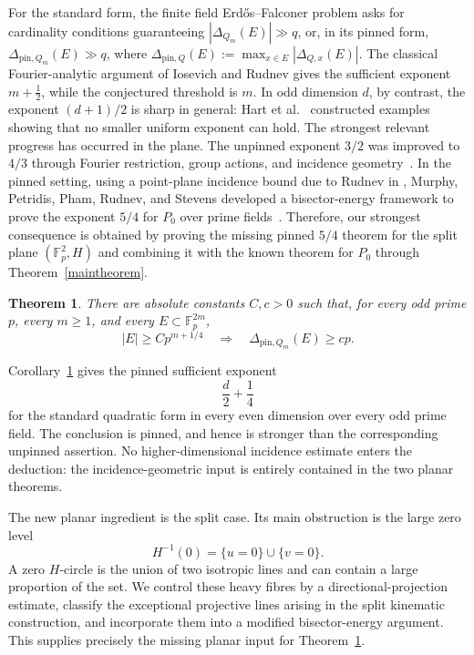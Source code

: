 \documentclass[11pt]{article}
\newtheorem{theorem}{Theorem}[section]
\newcommand{\F}{\mathbb F}
\begin{document}
For the standard form, the finite field Erd\H{o}s--Falconer problem asks
for cardinality conditions guaranteeing \(|\Delta_{Q_m}(E)|\gg q\), or,
in its pinned form, \(\Delta_{\mathrm{pin},Q_m}(E)\gg q\), where $\Delta_{\mathrm{pin},Q}(E)
 :=\max_{x\in E}|\Delta_{Q,x}(E)|$. The classical Fourier-analytic argument of Iosevich and Rudnev
\cite{IR} gives the sufficient exponent \(m+\frac12\), while the
conjectured threshold is \(m\).  In odd dimension $d$, by contrast, the
exponent \((d+1)/2\) is sharp in general: Hart et al.~\cite{hart}
constructed examples showing that no smaller uniform exponent can hold.  The strongest relevant progress has occurred in the plane.  The
unpinned exponent \(3/2\) was improved to \(4/3\) through Fourier
restriction, group actions, and incidence geometry~\cite{CEHIK,BHIPR}.
In the pinned setting, using a point-plane incidence bound due to Rudnev in \cite{Rud}, Murphy, Petridis, Pham, Rudnev, and
Stevens developed a
bisector-energy framework to prove the exponent \(5/4\) for \(P_0\) over prime
fields~\cite{MPPRS}. Therefore, our strongest consequence is obtained by proving the missing
pinned \(5/4\) theorem for the split plane \((\F_p^2,H)\) and combining it
with the known theorem for \(P_0\) through
Theorem~\ref{maintheorem}.

\begin{theorem}
\label{cor:pinned}
There are absolute constants \(C,c>0\) such that, for every odd prime \(p\),
every \(m\geq1\), and every \(E\subset\F_p^{2m}\),
\[
    |E|\geq C p^{m+1/4} \quad\Longrightarrow\quad \Delta_{\mathrm{pin},Q_m}(E)
    \geq c p.
\]
\end{theorem}

Corollary~\ref{cor:pinned} gives the pinned sufficient exponent
\[
\frac d2+\frac14
\]
for the standard quadratic form in every even dimension over every odd prime field.  The conclusion is pinned, and hence is stronger than the
corresponding unpinned assertion.  No higher-dimensional incidence estimate enters the deduction: the incidence-geometric input is entirely
contained in the two planar theorems.

The new planar ingredient is the split case.  Its main obstruction is the large zero level
\[
    H^{-1}(0)
    =
    \{u=0\}\cup\{v=0\}.
\]
A zero \(H\)-circle is the union of two isotropic lines and can contain a large proportion of the set.  We control these heavy fibres by a
directional-projection estimate, classify the exceptional projective lines arising in the split kinematic construction, and incorporate them into a modified bisector-energy argument.  This supplies precisely the missing planar input for Theorem~\ref{cor:pinned}.
\end{document}
